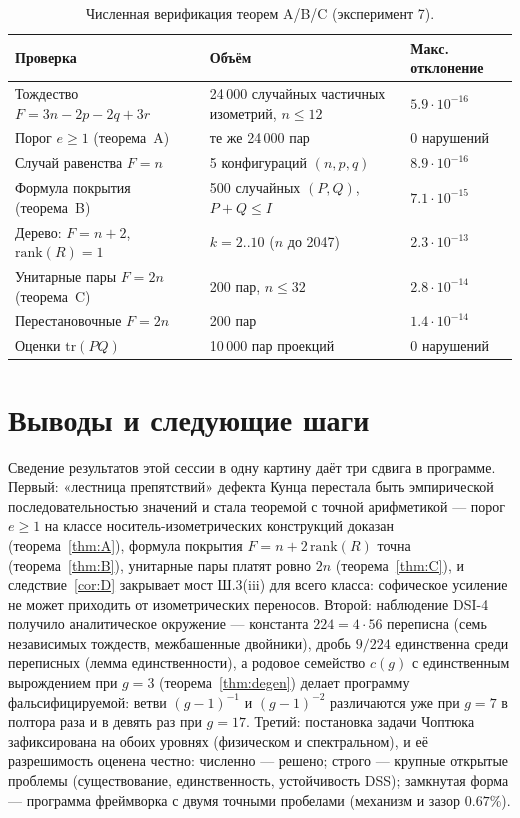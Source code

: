 \documentclass[11pt,a4paper]{article}
\theoremstyle{definition}
\theoremstyle{remark}
\begin{document}
\begin{table}[htbp]
\centering
\small
\caption{Численная верификация теорем A/B/C (эксперимент 7).}
\label{tab:verify}
\begin{tabularx}{\textwidth}{@{}lYY@{}}
\toprule
Проверка & Объём & Макс. отклонение \\
\midrule
Тождество $F = 3n - 2p - 2q + 3r$ & 24\,000 случайных частичных изометрий,
$n \le 12$ & $5.9\cdot 10^{-16}$ \\
Порог $e \ge 1$ (теорема~A) & те же 24\,000 пар & 0 нарушений \\
Случай равенства $F = n$ & 5 конфигураций $(n, p, q)$ & $8.9\cdot 10^{-16}$ \\
Формула покрытия (теорема~B) & 500 случайных $(P, Q)$, $P + Q \le I$ &
$7.1\cdot 10^{-15}$ \\
Дерево: $F = n + 2$, $\mathrm{rank}(R) = 1$ & $k = 2..10$ ($n$ до 2047) &
$2.3\cdot 10^{-13}$ \\
Унитарные пары $F = 2n$ (теорема~C) & 200 пар, $n \le 32$ & $2.8\cdot 10^{-14}$ \\
Перестановочные $F = 2n$ & 200 пар & $1.4\cdot 10^{-14}$ \\
Оценки $\mathrm{tr}(PQ)$ & 10\,000 пар проекций & 0 нарушений \\
\bottomrule
\end{tabularx}
\end{table}

\section{Выводы и следующие шаги}\label{sec:conclusions}

Сведение результатов этой сессии в одну картину даёт три сдвига в программе.
Первый: «лестница препятствий» дефекта Кунца перестала быть эмпирической
последовательностью значений и стала теоремой с точной арифметикой --- порог
$e \ge 1$ на классе носитель-изометрических конструкций доказан
(теорема~\ref{thm:A}), формула покрытия $F = n + 2\,\mathrm{rank}(R)$ точна
(теорема~\ref{thm:B}), унитарные пары платят ровно $2n$
(теорема~\ref{thm:C}), и следствие~\ref{cor:D} закрывает мост Ш.3(iii) для
всего класса: софическое усиление не может приходить от изометрических
переносов. Второй: наблюдение DSI-4 получило аналитическое окружение ---
константа $224 = 4\cdot 56$ переписна (семь независимых тождеств, межбашенные
двойники), дробь $9/224$ единственна среди переписных (лемма
единственности), а родовое семейство $c(g)$ с единственным вырождением при
$g = 3$ (теорема~\ref{thm:degen}) делает программу фальсифицируемой: ветви
$(g-1)^{-1}$ и $(g-1)^{-2}$ различаются уже при $g = 7$ в полтора раза и в
девять раз при $g = 17$. Третий: постановка задачи Чоптюка зафиксирована на
обоих уровнях (физическом и спектральном), и её разрешимость оценена честно:
численно --- решено; строго --- крупные открытые проблемы (существование,
единственность, устойчивость DSS); замкнутая форма --- программа фреймворка
с двумя точными пробелами (механизм и зазор $0.67\%$).
\end{document}

